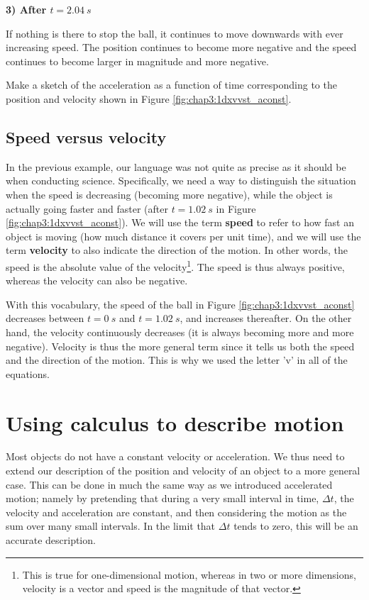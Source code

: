 \textbf{3) After $t=\SI{2.04}{s}$}

If nothing is there to stop the ball, it continues to move downwards with ever increasing speed. The position continues to become more negative and the speed continues to become larger in magnitude and more negative.

\begin{checkpointSA}{Make a sketch of the acceleration as a function of time corresponding to the position and velocity shown in Figure \ref{fig:chap3:1dxvvst_aconst}.}
\end{checkpointSA}

\subsection{Speed versus velocity}
In the previous example, our language was not quite as precise as it should be when conducting science. Specifically, we need a way to distinguish the situation when the speed is decreasing (becoming more negative), while the object is actually going faster and faster (after $t=\SI{1.02}{s}$ in Figure \ref{fig:chap3:1dxvvst_aconst}). We will use the term \textbf{speed} to refer to how fast an object is moving (how much distance it covers per unit time), and we will use the term \textbf{velocity} to also indicate the direction of the motion. In other words, the speed is the absolute value of the velocity\footnote{This is true for one-dimensional motion, whereas in two or more dimensions, velocity is a vector and speed is the magnitude of that vector.}. The speed is thus always positive, whereas the velocity can also be negative.

With this vocabulary, the speed of the ball in Figure \ref{fig:chap3:1dxvvst_aconst} decreases between $t=\SI{0}{s}$ and $t=\SI{1.02}{s}$, and increases thereafter. On the other hand, the velocity continuously decreases (it is always becoming more and more negative). Velocity is thus the more general term since it tells us both the speed and the direction of the motion. This is why we used the letter 'v' in all of the equations.

\section{Using calculus to describe motion}
Most objects do not have a constant velocity or acceleration. We thus need to extend our description of the position and velocity of an object to a more general case. This can be done in much the same way as we introduced accelerated motion; namely by pretending that during a very small interval in time, $\Delta t$, the velocity and acceleration are constant, and then considering the motion as the sum over many small intervals. In the limit that $\Delta t$ tends to zero, this will be an accurate description. 

